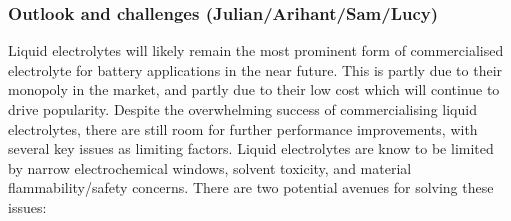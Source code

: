 \documentclass[../main.tex]{subfiles}
\begin{document}
\subsubsection{Outlook and challenges (Julian/Arihant/Sam/Lucy)}
Liquid electrolytes will likely remain the most prominent form of commercialised electrolyte for battery applications in the near future. This is partly due to their monopoly in the market, and partly due to their low cost which will continue to drive popularity. Despite the overwhelming success of commercialising liquid electrolytes, there are still room for further performance improvements, with several key issues as limiting factors. Liquid electrolytes are know to be limited by narrow electrochemical windows, solvent toxicity, and material flammability/safety concerns. There are two potential avenues for solving these issues:
\end{document}

